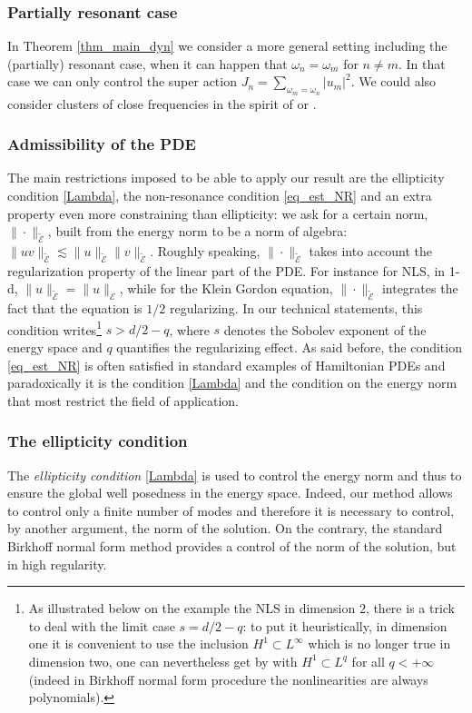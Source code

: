 \documentclass[JEP,XML,SOM,Unicode,NoEqCountersInSection,published]{cedram}
\theoremstyle{definition}
\begin{document}
\subsubsection*{Partially resonant case}
In Theorem \ref{thm_main_dyn} we consider a more general setting including the (partially) resonant case, \ie when it can happen that $\omega_n=\omega_m$ for $n\neq m$. In that case we can only control the super action $J_n=\sum_{\omega_m=\omega_n}|u_m|^2$. We could also consider clusters of close frequencies in the spirit of \cite{BDGS07} or \cite{GIP}.

\subsubsection*{Admissibility of the PDE}
The main restrictions imposed to be able to apply our result are the ellipticity condition \eqref{Lambda}, the non-resonance condition \eqref{eq_est_NR} and an extra property even more constraining than ellipticity: we ask for a certain norm, $\|\cdot\|_{\tilde{\mathcal{E}}}$, built from the energy norm to be a norm of algebra:
$\|uv\|_{\tilde{\mathcal{E}}}\lesssim \|u\|_{\tilde{\mathcal{E}}} \|v\|_{\tilde{\mathcal{E}}}$. Roughly speaking, $\|\cdot\|_{\tilde{\mathcal{E}}}$ takes into account the regularization property of the linear part of the PDE. For instance for NLS, in 1-d, $\| u\|_{\tilde{\mathcal{E}}}=\|u\|_{{\mathcal{E}}}$, while for the Klein Gordon equation, $\|\cdot\|_{\tilde{\mathcal{E}}}$ integrates the fact that the equation is $1/2$ regularizing. In our technical statements, this condition writes\footnote{As illustrated below on the example the NLS in dimension $2$, there is a trick to deal with the limit case $s=d/2-q$: to put it heuristically, in dimension one it is convenient to use the inclusion $H^1\subset L^\infty$ which is no longer true in dimension two, one can nevertheless get by with $H^1\subset L^q$ for all $q<+\infty$ (indeed in Birkhoff normal form procedure the nonlinearities are always polynomials).} $s>d/2-q$, where $s$ denotes the Sobolev exponent of the energy space and $q$ quantifies the regularizing effect. As said before, the condition \eqref{eq_est_NR} is often satisfied in standard examples of Hamiltonian PDEs and paradoxically it is the condition \eqref{Lambda} and the condition on the energy norm that most restrict the field of application.

\subsubsection*{The ellipticity condition}
The {\it ellipticity condition} \eqref{Lambda} is used to control the energy norm and thus to ensure the global well posedness in the energy space. Indeed, our method allows to control only a finite number of modes and therefore it is necessary to control, by another argument, the norm of the solution. On the contrary, the standard Birkhoff normal form method provides a control of the norm of the solution, but in high regularity.
\end{document}
